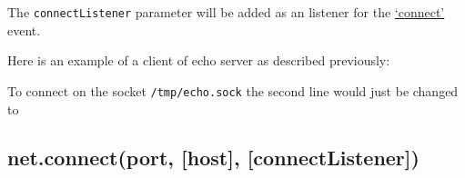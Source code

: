 The \texttt{connectListener} parameter will be added as an listener for
the \hyperref[netux5feventux5fconnect]{`connect'} event.

Here is an example of a client of echo server as described previously:

\begin{Shaded}
\begin{Highlighting}[]
 \NormalTok{(}\NormalTok{);}
 \NormalTok{(\{}\NormalTok{: }\NormalTok{\},}
    \NormalTok{() \{ }
  \NormalTok{(}\NormalTok{);}
  \NormalTok{(}\NormalTok{);}
\NormalTok{\});}
\NormalTok{(}\NormalTok{, }
  \NormalTok{(}\NormalTok{());}
  \NormalTok{();}
\NormalTok{\});}
\NormalTok{(}\NormalTok{, }\NormalTok{() \{}
  \NormalTok{(}\NormalTok{);}
\NormalTok{\});}
\end{Highlighting}
\end{Shaded}

To connect on the socket \texttt{/tmp/echo.sock} the second line would
just be changed to

\begin{Shaded}
\begin{Highlighting}[]
 \NormalTok{(\{}\NormalTok{: }\NormalTok{\});}
\end{Highlighting}
\end{Shaded}

\subsection{net.connect(port, {[}host{]},
{[}connectListener{]})}\label{net.connectport-host-connectlistener}

